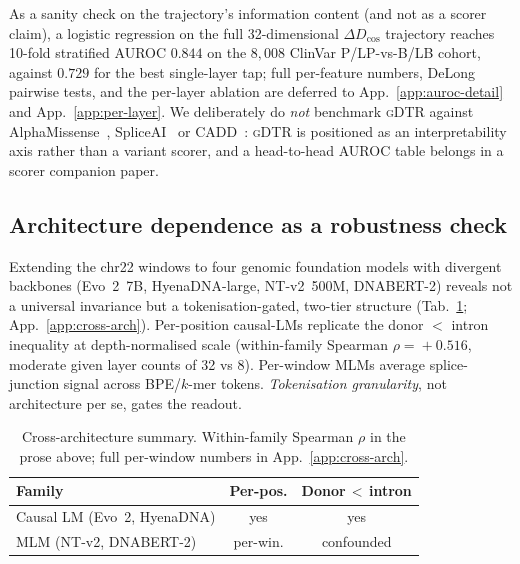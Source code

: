 \documentclass{article}
\theoremstyle{plain}
\theoremstyle{definition}
\theoremstyle{remark}
\newcommand{\gDTR}{\textsc{gDTR}}
\newcommand{\DDcos}{\Delta D_{\cos}}
\begin{document}
As a sanity check on the trajectory's information content (and not as a scorer claim), a logistic regression on the full 32-dimensional $\DDcos$ trajectory reaches 10-fold stratified AUROC $0.844$ on the $8{,}008$ ClinVar P/LP-vs-B/LB cohort, against $0.729$ for the best single-layer tap; full per-feature numbers, DeLong~\cite{delong1988comparing} pairwise tests, and the per-layer ablation are deferred to App.~\ref{app:auroc-detail} and App.~\ref{app:per-layer}. We deliberately do \emph{not} benchmark \gDTR{} against AlphaMissense~\cite{cheng2023alphamissense}, SpliceAI~\cite{jaganathan2019spliceai} or CADD~\cite{rentzsch2019cadd}: \gDTR{} is positioned as an interpretability axis rather than a variant scorer, and a head-to-head AUROC table belongs in a scorer companion paper.


\subsection{Architecture dependence as a robustness check}
\label{sec:cross-arch}

Extending the chr22 windows to four genomic foundation models with divergent backbones (Evo~2~7B, HyenaDNA-large, NT-v2~500M, DNABERT-2) reveals not a universal invariance but a tokenisation-gated, two-tier structure (Tab.~\ref{tab:cross-arch-summary}; App.~\ref{app:cross-arch}). Per-position causal-LMs replicate the donor $<$ intron inequality at depth-normalised scale (within-family Spearman $\rho\!=\!+0.516$, moderate given layer counts of 32 vs 8). Per-window MLMs average splice-junction signal across BPE/$k$-mer tokens. \emph{Tokenisation granularity}, not architecture per se, gates the readout.

\begin{table}[!h]
\caption{Cross-architecture summary. Within-family Spearman $\rho$ in the prose above; full per-window numbers in App.~\ref{app:cross-arch}.}
\label{tab:cross-arch-summary}
\centering
\footnotesize
\setlength{\tabcolsep}{4pt}
\begin{tabular}{@{}lcc@{}}
\toprule
Family & Per-pos. & Donor$\,{<}\,$intron \\
\midrule
Causal LM (Evo~2, HyenaDNA) & yes      & yes \\
MLM (NT-v2, DNABERT-2)      & per-win. & confounded \\
\bottomrule
\end{tabular}
\end{table}


\end{document}

